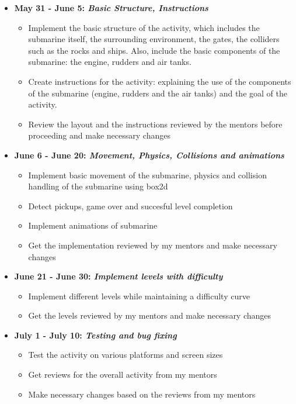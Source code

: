 \documentclass[preprint,12pt]{elsarticle}
\begin{document}
\begin{itemize}

\item \textbf{May 31 - June 5: \textit{Basic Structure, Instructions}}

\begin{itemize}
\item Implement the basic structure of the activity, which includes the submarine itself, the surrounding environment, the gates, the colliders such as the rocks and ships. Also, include the basic components of the submarine: the engine, rudders and air tanks.

\item Create instructions for the activity: explaining the use of the components of the submarine (engine, rudders and the air tanks) and the goal of the activity.

\item Review the layout and the instructions reviewed by the mentors before proceeding and make necessary changes
\end{itemize}

\item \textbf{June 6 - June 20: \textit{Movement, Physics, Collisions and animations}}

\begin{itemize}
\item Implement basic movement of the submarine, physics and collision handling of the submarine using box2d
\item Detect pickups, game over and succesful level completion
\item Implement animations of submarine
\item Get the implementation reviewed by my mentors and make necessary changes
\end{itemize}

\item \textbf{June 21 - June 30: \textit{Implement levels with difficulty}}
\begin{itemize}
\item Implement different levels while maintaining a difficulty curve
\item Get the levels reviewed by my mentors and make necessary changes
\end{itemize}

\item \textbf{July 1 - July 10: \textit{Testing and bug fixing}}
\begin{itemize}
\item Test the activity on various platforms and screen sizes
\item Get reviews for the overall activity from my mentors
\item Make necessary changes based on the reviews from my mentors
\end{itemize}

\end{itemize}
\end{document}
